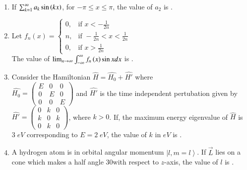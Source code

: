 \documentclass[journal,12pt,onecolumn]{IEEEtran}
\theoremstyle{remark}
\begin{document}
\begin{enumerate}[start=53]
\item If $\sum_{k=1}^{\infty}a_k\sin\left(kx\right)$, for $-\pi \leq x \leq\pi$, the value of $a_2$ is \underline{\hspace{2cm}}.
\item Let $f_n(x) = 
\begin{cases} 
    0, & \text{if } x < -\frac{1}{2n} \\ 
    n, & \text{if } -\frac{1}{2n} < x < \frac{1}{2n} \\ 
    0, & \text{if } x > \frac{1}{2n} 
\end{cases}$\\ The value of $\lim_{n\to \infty}\int_{-\infty}^{\infty}f_n\left(x\right)\sin xdx$ is \underline{\hspace{2cm}}.

\item Consider the Hamiltonian $\hat{H}=\hat{H_0}+\hat{H'}$ where\\
$\hat{H_0}=
\begin{pmatrix}
    E & 0 & 0\\
    0 & E & 0\\
    0 & 0 & E
\end{pmatrix}$ and $\hat{H'}$ is the time independent pertubation given by \\
$\hat{H'}=\begin{pmatrix}
    0 & k & 0\\
    k & 0 & k\\
    0 & k & 0
\end{pmatrix}$, where $k>0$. If, the maximum energy eigenvalue of $\hat{H}$ is $3\;eV$ corresponding to $E=2\;eV$, the value of $k$  in $eV$ is \underline{\hspace{2cm}}.
\item A hydrogen atom is in orbital angular momentum $\left | l,m=l\right\rangle$. If $\overrightarrow{L}$ lies on a cone which makes a half angle 30\degree with respect to $z$-axis, the value of $l$ is \underline{\hspace{2cm}}.


\end{enumerate}
\end{document}
